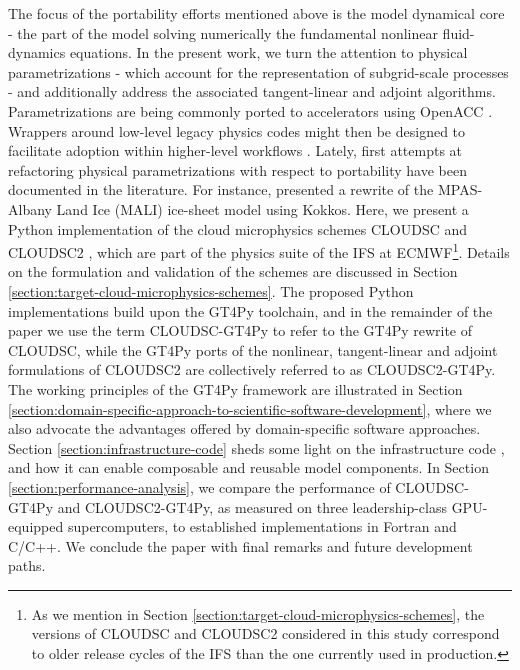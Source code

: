 \documentclass[gmd,manuscript,online]{copernicus}
\theoremstyle{theorem}
\theoremstyle{definition}
\theoremstyle{remark}
\theoremstyle{proposition}
\begin{document}
	The focus of the portability efforts mentioned above is the model dynamical core - the part of the model solving numerically the fundamental nonlinear fluid-dynamics equations. In the present work, we turn the attention to physical parametrizations - which account for the representation of subgrid-scale processes - and additionally address the associated tangent-linear and adjoint algorithms. Parametrizations are being commonly ported to accelerators using OpenACC \citep[e.g., ][]{fuhrer14, yang19, kim21}. Wrappers around low-level legacy physics codes might then be designed to facilitate adoption within higher-level workflows \citep{monteiro18, mcgibbon21}. Lately, first attempts at refactoring physical parametrizations with respect to portability have been documented in the literature. For instance, \citet{watkins23} presented a rewrite of the MPAS-Albany Land Ice (MALI) ice-sheet model using Kokkos. Here, we present a Python implementation of the cloud microphysics schemes CLOUDSC \citep{gt4py-dwarf-p-cloudsc} and CLOUDSC2 \citep{gt4py-dwarf-p-cloudsc2-tl-ad}, which are part of the physics suite of the IFS at ECMWF\footnote{As we mention in Section \ref{section:target-cloud-microphysics-schemes}, the versions of CLOUDSC and CLOUDSC2 considered in this study correspond to older release cycles of the IFS than the one currently used in production.}. Details on the formulation and validation of the schemes are discussed in Section \ref{section:target-cloud-microphysics-schemes}. The proposed Python implementations build upon the GT4Py toolchain, and in the remainder of the paper we use the term CLOUDSC-GT4Py to refer to the GT4Py rewrite of CLOUDSC, while the GT4Py ports of the nonlinear, tangent-linear and adjoint formulations of CLOUDSC2 are collectively referred to as CLOUDSC2-GT4Py. The working principles of the GT4Py framework are illustrated in Section \ref{section:domain-specific-approach-to-scientific-software-development}, where we also advocate the advantages offered by domain-specific software approaches. Section \ref{section:infrastructure-code} sheds some light on the infrastructure code \citep{ifs-physics-common}, and how it can enable composable and reusable model components. In Section \ref{section:performance-analysis}, we compare the performance of CLOUDSC-GT4Py and CLOUDSC2-GT4Py, as measured on three leadership-class GPU-equipped supercomputers, to established implementations in Fortran and C/C++. We conclude the paper with final remarks and future development paths.

\end{document}
